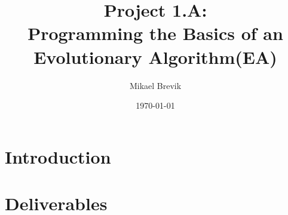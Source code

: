 \documentclass[a4paper, 11pt]{report}
\title{Project 1.A: \\ Programming the Basics of an \\ Evolutionary Algorithm(EA)}
\author{Mikael Brevik}
\date{\today}
\begin{document}
\maketitle
\tableofcontents


\chapter{Introduction}


\chapter{Deliverables}	

\newpage

\newpage

\newpage

\newpage


\listoffigures
\end{document}
